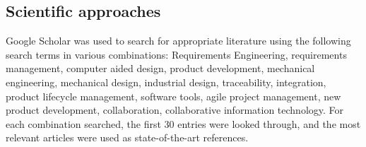     \subsection*{Scientific approaches}
    \label{sec:scientific}
    Google Scholar was used to search for appropriate literature using the following search terms in various combinations: Requirements Engineering, requirements management, computer aided design, product development, mechanical engineering, mechanical design, industrial design, traceability, integration, product lifecycle management, software tools, agile project management, new product development, collaboration, collaborative information technology. For each combination searched, the first 30 entries were looked through, and the most relevant articles were used as state-of-the-art references. 
    
